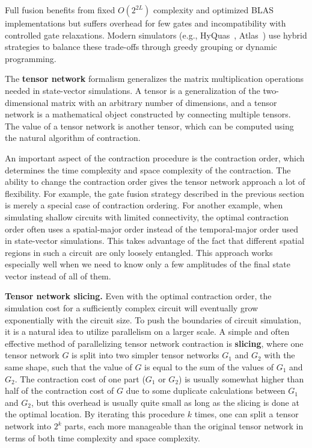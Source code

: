 \documentclass[a4paper,onecolumn,11pt,unpublished]{quantumarticle}
\begin{document}
Full fusion benefits from fixed $O(2^{2L})$ complexity and optimized BLAS implementations but suffers overhead for few gates and incompatibility with controlled gate relaxations. Modern simulators (e.g., HyQuas~\cite{zhangHyQuasHybridPartitioner2021}, Atlas~\cite{xuAtlasHierarchicalPartitioning2024b}) use hybrid strategies to balance these trade-offs through greedy grouping or dynamic programming.

The \textbf{tensor network} formalism generalizes the matrix multiplication operations needed in state-vector simulations. 
A tensor is a generalization of the two-dimensional matrix with an arbitrary number of dimensions, and a tensor network is a mathematical object constructed by connecting multiple tensors. The value of a tensor network is another tensor, which can be computed using the natural algorithm of contraction.

An important aspect of the contraction procedure is the contraction order, which determines the time complexity and space complexity of the contraction. The ability to change the contraction order gives the tensor network approach a lot of flexibility. For example, the gate fusion strategy described in the previous section is merely a special case of contraction ordering. For another example, when simulating shallow circuits with limited connectivity, the optimal contraction order often uses a spatial-major order instead of the temporal-major order used in state-vector simulations. This takes advantage of the fact that different spatial regions in such a circuit are only loosely entangled. This approach works especially well when we need to know only a few amplitudes of the final state vector instead of all of them.

\textbf{Tensor network slicing.} Even with the optimal contraction order, the simulation cost for a sufficiently complex circuit will eventually grow exponentially with the circuit size. To push the boundaries of circuit simulation, it is a natural idea to utilize parallelism on a larger scale. A simple and often effective method of parallelizing tensor network contraction is \textbf{slicing}, where one tensor network $G$ is split into two simpler tensor networks $G_1$ and $G_2$ with the same shape, such that the value of $G$ is equal to the sum of the values of $G_1$ and $G_2$. The contraction cost of one part ($G_1$ or $G_2$) is usually somewhat higher than half of the contraction cost of $G$ due to some duplicate calculations between $G_1$ and $G_2$, but this overhead is usually quite small as long as the slicing is done at the optimal location. By iterating this procedure $k$ times, one can split a tensor network into $2^k$ parts, each more manageable than the original tensor network in terms of both time complexity and space complexity.
\end{document}
